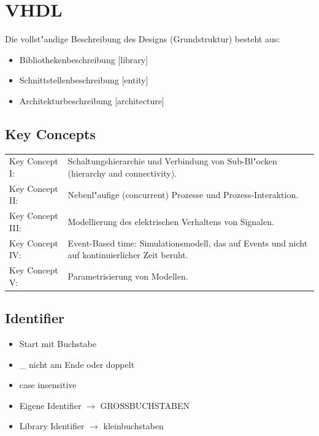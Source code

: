 \section{VHDL}
	Die vollst"andige Beschreibung des Designs (Grundstruktur) besteht aus:
	\begin{itemize}
	\setlength{\itemsep}{0pt}
  	\setlength{\parskip}{0pt}
  	\setlength{\parsep}{0pt}
		\item Bibliothekenbeschreibung [library]
		\item Schnittstellenbeschreibung [entity]
		\item Architekturbeschreibung [architecture]
	\end{itemize}

	\subsection{Key Concepts}
		\begin{tabular}{ll}
			Key Concept I: & Schaltungshierarchie und Verbindung von Sub-Bl"ocken 
				(hierarchy and connectivity).\\
			Key Concept II: & Nebenl"aufige (concurrent) Prozesse und Prozess-Interaktion.\\
			Key Concept III: & Modellierung des elektrischen Verhaltens von Signalen.\\
			Key Concept IV: & Event-Based time: Simulationsmodell, das auf Events und nicht 
				auf kontinuierlicher Zeit beruht.\\
			Key Concept V: & Parametrisierung von Modellen.
		\end{tabular}
	\subsection{Identifier}
		\begin{itemize}
			\setlength{\itemsep}{0pt}
  			\setlength{\parskip}{0pt}
  			\setlength{\parsep}{0pt}
				\item Start mit Buchstabe
				\item \_ nicht am Ende oder doppelt
				\item case insensitive
				\item Eigene Identifier $\rightarrow$ GROSSBUCHSTABEN
				\item Library Identifier $\rightarrow$ kleinbuchstaben
		\end{itemize}

